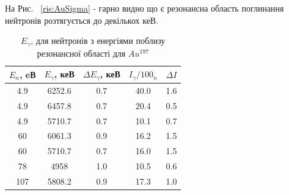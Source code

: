 \documentclass[a4paper, 14pt]{article}
\numberwithin{equation}{section}
\numberwithin{table}{section}
\begin{document}
На Рис. ~\ref{ris:AuSigma} - гарно видно що є резонансна область поглинання нейтронів розтягується до декількох кеВ. 
\begin{table}[h]
	\centering
	\begin{tabular}{|c|c|c|c|c|} 
		\hline
		$E_{n}$, eВ&$E_{\gamma}$, кеВ & $\Delta{E_{\gamma}}$, кеВ & $I_{\gamma} / 100_n$ & $\Delta{I}$ \\
		\hline
		4.9 & 6252.6 & 0.7 & 40.0 & 1.6 \\
		\hline
		4.9 & 6457.8 & 0.7 & 20.4 & 0.5\\	
		\hline
		4.9 & 5710.7 & 0.7 & 10.1 & 0.7 \\	
		\hline	%
		60 & 6061.3 & 0.9 & 16.2 & 1.5 \\	
		\hline %
		60 & 5710.7 & 0.7 & 16.0 & 1.5 \\	
		\hline %
		78 & 4958 & 1.0 & 10.5 & 0.6\\	
		\hline%
		107 & 5808.2 & 0.9 & 17.3 & 1.0 \\	
		\hline
	\end{tabular}
	\caption{$E_\gamma$, для нейтронів з енергіями поблизу резонансної області для $Au^{197}$} 
	\label{tabl:AuNeutronAbsorption}
\end{table}
\end{document}
